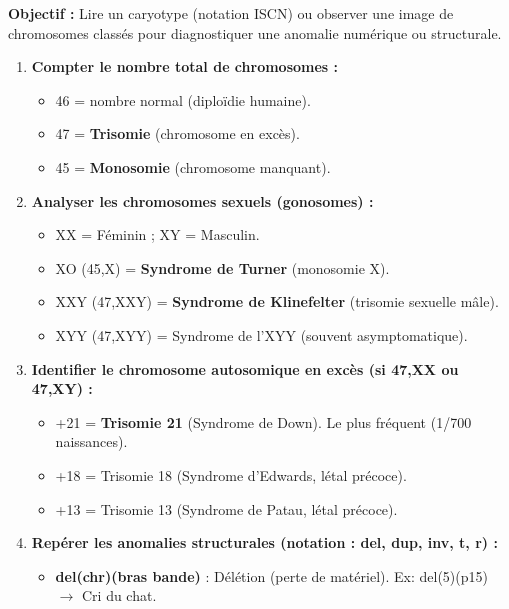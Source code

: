 \documentclass[11pt]{article}
\begin{document}
\begin{methode}
    \textbf{Objectif :} Lire un caryotype (notation ISCN) ou observer une image de chromosomes classés pour diagnostiquer une anomalie numérique ou structurale.
    \begin{enumerate}
        \item \textbf{Compter le nombre total de chromosomes :}
              \begin{itemize}
                  \item 46 = nombre normal (diploïdie humaine).
                  \item 47 = \textbf{Trisomie} (chromosome en excès).
                  \item 45 = \textbf{Monosomie} (chromosome manquant).
              \end{itemize}
        \item \textbf{Analyser les chromosomes sexuels (gonosomes) :}
              \begin{itemize}
                  \item XX = Féminin ; XY = Masculin.
                  \item XO (45,X) = \textbf{Syndrome de Turner} (monosomie X).
                  \item XXY (47,XXY) = \textbf{Syndrome de Klinefelter} (trisomie sexuelle mâle).
                  \item XYY (47,XYY) = Syndrome de l'XYY (souvent asymptomatique).
              \end{itemize}
        \item \textbf{Identifier le chromosome autosomique en excès (si 47,XX ou 47,XY) :}
              \begin{itemize}
                  \item +21 = \textbf{Trisomie 21} (Syndrome de Down). Le plus fréquent (1/700 naissances).
                  \item +18 = Trisomie 18 (Syndrome d'Edwards, létal précoce).
                  \item +13 = Trisomie 13 (Syndrome de Patau, létal précoce).
              \end{itemize}
        \item \textbf{Repérer les anomalies structurales (notation : del, dup, inv, t, r) :}
              \begin{itemize}
                  \item \textbf{del(chr)(bras bande)} : Délétion (perte de matériel). Ex: del(5)(p15) $\rightarrow$ Cri du chat.

\end{itemize}
\end{enumerate}
\end{methode}
\end{document}
